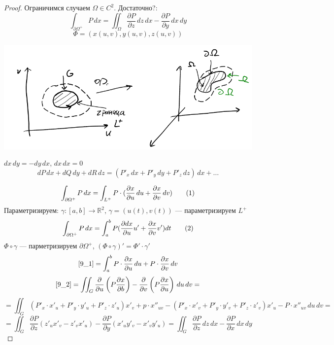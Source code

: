 \documentclass[english]{article}
\newcommand\addtag{\refstepcounter{equation}\tag{\theequation}}
\newcommand{\R}{\mathbb{R}}
\theoremstyle{plain}
\theoremstyle{remark}
\theoremstyle{definition}
\begin{document}
\begin{proof}
Ограничимся случаем \(\Omega \in C^2\). Достаточно?:
\[ \int_{\partial \Omega^+} P\,dx = \iint_\Omega\frac{\partial P}{\partial z}\,dz\,dx  - \frac{\partial P}{\partial y}\,dx\,dy \]
\[ \Phi = (x(u, v), y(u, v), z(u, v)) \]
\begin{center}
\includegraphics[scale=0.5]{9_3.png}
\end{center}
\color{blue}
\(dx\,dy = - dy\,dx\), \(dx\,dx = 0\)
\[ dP\,dx + dQ\,dy + dR\,dz = (P'_x\,dx + P'_y\,dy + P'_z\,dz)\,dx + \dots \]

\color{black}
\[ \int_{\partial \Omega^+} P\,dx = \int_{L^+} P\cdot (\frac{\partial x}{\partial u}\,du + \frac{\partial x}{\partial v}\,dv) \addtag\label{9_2} \]
\color{blue}
Параметризируем: \(\gamma: [a, b] \to \R^2\), \(\gamma = (u(t), v(t))\) --- параметризируем \(L^+\)
\[ \int_{\partial \Omega^+} P\,dx = \int_a^b P(\frac{\partial dx}{\partial u}u' + \frac{\partial x}{\partial v}v')dt \addtag\label{9_1}\]
\(\Phi \circ \gamma\) --- парметризируем \(\partial \Omega^+\), \((\Phi \circ \gamma)' = \Phi' \cdot \gamma'\)
\[ \ref{9_1} = \int_a^b P\cdot\frac{\partial x}{\partial u}\,du + P \cdot \frac{\partial x}{\partial v}\,dv \]
\color{black}
\[ \ref{9_2} = \iint_G \frac{\partial}{\partial u}\left(P\frac{\partial x}{\partial b}\right) - \frac{\partial}{\partial v} \left(P \frac{\partial x}{\partial u}\right)\,du\,dv = \]
\[ = \iint_G (P'_x\cdot x'_u + P'_y\cdot y'_u + P'_z\cdot z'_u)x'_v + p\cdot x''_{uv} - (P'_x\cdot x'_v + P'_y\cdot y'_v + P'_z\cdot z'_v)x'_u - P\cdot x''_{uv} \,du\,dv = \]
\[ = \iint_G \frac{\partial P}{\partial z} (z'_ux'_v - z'_vx'_u) - \frac{\partial P}{\partial y}(x'_uy'_v - x'_vy'_u) = \iint_G \frac{\partial P}{\partial z}\,dz\,dx - \frac{\partial P}{\partial x}\,dx\,dy\]
\end{proof}
\end{document}
